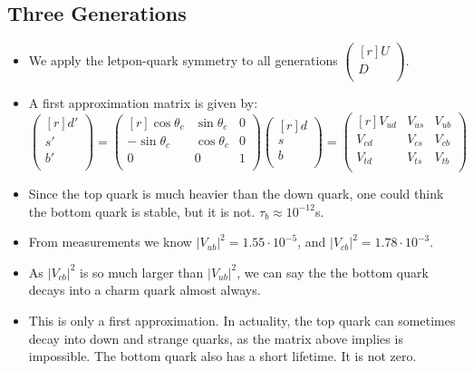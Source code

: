 \subsection{Three Generations}
\begin{itemize}
  \item We apply the letpon-quark symmetry to all generations $\begin{pmatrix*}[r]
   U \\
   D \\
  \end{pmatrix*}$. 
  \item A first approximation matrix is given by:
  \begin{equation}
    \begin{pmatrix*}[r]
     d' \\
     s' \\
     b' \\
    \end{pmatrix*} = 
    \begin{pmatrix*}[r]
      \cos θ_c & \sin θ_c & 0 \\
      -\sin θ_c & \cos θ_c & 0 \\
      0 & 0 & 1 \\
    \end{pmatrix*} 
    \begin{pmatrix*}[r]
      d \\
      s \\
      b \\
    \end{pmatrix*} = 
    \begin{pmatrix*}[r]
     V_{ud} & V_{us} & V_{ub} \\
     V_{cd} & V_{cs} & V_{cb} \\
     V_{td} & V_{ts} & V_{tb} \\
    \end{pmatrix*}
  \end{equation}
  \item Since the top quark is much heavier than the down quark, one could think the bottom quark is stable, but it is not. $τ_b ≈ 10^{-12}$s. 
  \item From measurements we know $\left|V_{ub}\right|^2 = 1.55 ⋅ 10^{-5}$, and $\left|V_{cb}\right|^2 = 1.78 ⋅ 10^{-3}$.
  \item As $\left|V_{cb}\right|^2$ is so much larger than $\left|V_{ub}\right|^2$, we can say the the bottom quark decays into a charm quark almost always.
  \item This is only a first approximation. In actuality, the top quark can sometimes decay into down and strange quarks, as the matrix above implies is impossible. The bottom quark also has a short lifetime. It is not zero. 

\end{itemize}
